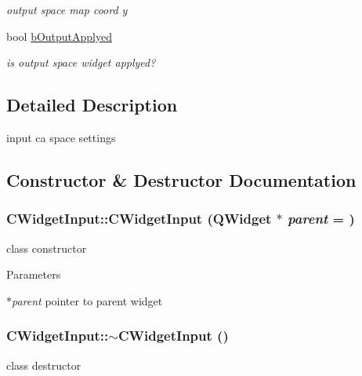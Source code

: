 \begin{DoxyCompactItemize}
\begin{DoxyCompactList}\small\item\em output space map coord y \item\end{DoxyCompactList}\item 
\hypertarget{classCWidgetInput_a8bfff7342cfe3db74d8d35fcda33a40c}{
bool \hyperlink{classCWidgetInput_a8bfff7342cfe3db74d8d35fcda33a40c}{bOutputApplyed}}
\label{classCWidgetInput_a8bfff7342cfe3db74d8d35fcda33a40c}

\begin{DoxyCompactList}\small\item\em is output space widget applyed? \item\end{DoxyCompactList}\end{DoxyCompactItemize}


\subsection{Detailed Description}
input ca space settings 

\subsection{Constructor \& Destructor Documentation}
\hypertarget{classCWidgetInput_a7595b91af57924e97909c96956031371}{
\subsubsection[{CWidgetInput}]{\setlength{\rightskip}{0pt plus 5cm}CWidgetInput::CWidgetInput (QWidget $\ast$ {\em parent} = {})}}
\label{classCWidgetInput_a7595b91af57924e97909c96956031371}
class constructor


\begin{DoxyParams}{Parameters}
\item[{\em $\ast$parent}]pointer to parent widget \end{DoxyParams}
\hypertarget{classCWidgetInput_afc915feb98e5ef4c8e6f8289ff26e4ef}{
\subsubsection[{$\sim$CWidgetInput}]{\setlength{\rightskip}{0pt plus 5cm}CWidgetInput::$\sim$CWidgetInput ()}}
\label{classCWidgetInput_afc915feb98e5ef4c8e6f8289ff26e4ef}
class destructor 

